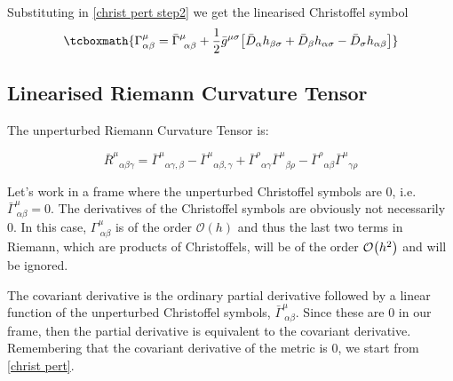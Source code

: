\documentclass[12pt, letterpaper]{report}
\begin{document}
Substituting in \cref{christ pert step2} we get the linearised Christoffel symbol 
\begin{equation}
\tcboxmath{
\Gamma^{\mu}_{\alpha\beta}= \bar{\Gamma}^{\mu}_{\ \alpha\beta} + \frac{1}{2}\bar{g}^{\mu\sigma}\qty[\bar{D}_\alpha h_{\beta\sigma}+\bar{D}_{\beta}h_{\alpha\sigma}-\bar{D}_{\sigma}h_{\alpha\beta}]}
\label{christ pert}
\end{equation}

\subsection{Linearised Riemann Curvature Tensor}

The unperturbed Riemann Curvature Tensor is: 

$$\bar{R}^{\mu }{}_{\alpha \beta \gamma }=\bar{\Gamma} ^{\mu }{}_{\alpha \gamma ,\beta }- \bar{\Gamma} ^{\mu }{}_{\alpha \beta ,\gamma }+\bar{\Gamma} ^{\rho }{}_{\alpha \gamma } \bar{\Gamma} ^{\mu }{}_{\beta \rho }- \bar{\Gamma} ^{\rho }{}_{\alpha \beta } \bar{\Gamma} ^{\mu }{}_{\gamma \rho }$$

Let's work in a frame where the unperturbed Christoffel symbols are $0$, i.e. $\bar{\Gamma}^{\mu}_{\ \alpha\beta}= 0$. The derivatives of the Christoffel symbols are obviously not necessarily $0$. In this case, ${\Gamma}^{\mu}_{\ \alpha\beta}$ is of the order $\mathcal{O} (h)$ and thus the last two terms in Riemann, which are products of Christoffels, will be of the order $\mathcal{O} \qty(h^2)$ and will be ignored. 

The covariant derivative is the ordinary partial derivative followed by a linear function of the unperturbed Christoffel symbols, $\bar{\Gamma}^{\mu}_{\ \alpha\beta}$. Since these are $0$ in our frame, then the partial derivative is equivalent to the covariant derivative. Remembering that the covariant derivative of the metric is $0$, we start from \cref{christ pert}.
\end{document}
